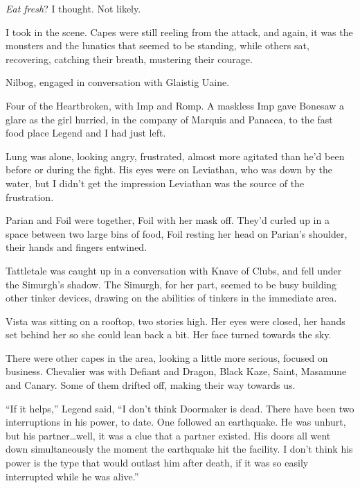 \emph{Eat fresh}?  I thought.  Not likely.



I took in the scene.  Capes were still reeling from the attack, and again, it was the monsters and the lunatics that seemed to be standing, while others sat, recovering, catching their breath, mustering their courage.



Nilbog, engaged in conversation with Glaistig Uaine.



Four of the Heartbroken, with Imp and Romp.  A maskless Imp gave Bonesaw a glare as the girl hurried, in the company of Marquis and Panacea, to the fast food place Legend and I had just left.



Lung was alone, looking angry, frustrated, almost more agitated than he'd been before or during the fight.  His eyes were on Leviathan, who was down by the water, but I didn't get the impression Leviathan was the source of the frustration.



Parian and Foil were together, Foil with her mask off.  They'd curled up in a space between two large bins of food, Foil resting her head on Parian's shoulder, their hands and fingers entwined.



Tattletale was caught up in a conversation with Knave of Clubs, and fell under the Simurgh's shadow.  The Simurgh, for her part, seemed to be busy building other tinker devices, drawing on the abilities of tinkers in the immediate area.



Vista was sitting on a rooftop, two stories high.  Her eyes were closed, her hands set behind her so she could lean back a bit.  Her face turned towards the sky.



There were other capes in the area, looking a little more serious, focused on business.  Chevalier was with Defiant and Dragon, Black Kaze, Saint, Masamune and Canary.  Some of them drifted off, making their way towards us.



``If it helps,'' Legend said, ``I don't think Doormaker is dead.  There have been two interruptions in his power, to date.  One followed an earthquake.  He was unhurt, but his partner\ldots well, it was a clue that a partner existed.  His doors all went down simultaneously the moment the earthquake hit the facility.  I don't think his power is the type that would outlast him after death, if it was so easily interrupted while he was alive.''



